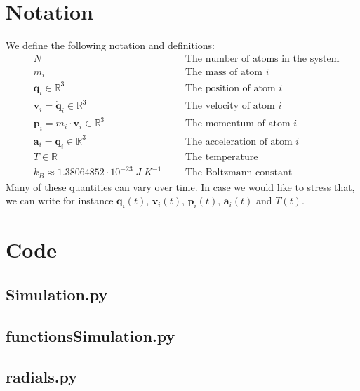 \documentclass[11pt,a4paper]{article}
\begin{document}
\section{Notation}\label{notation}
We define the following notation and definitions:
\begin{align*}
& N & & & \textrm{The number of atoms in the system} \\
& m_i & & & \textrm{The mass of atom } i \\
& \textbf{q}_i \in \mathbb{R}^3 & & & \textrm{The position of atom } i \\
& \textbf{v}_i = \textrm{$\dot{\textbf{q}}$}_i \in \mathbb{R}^3 & & & \textrm{The velocity of atom } i \\
& \textbf{p}_i = m_i \cdot \textbf{v}_i \in \mathbb{R}^3 & & & \textrm{The momentum of atom } i \\
& \textbf{a}_i = \textrm{$\ddot{\textbf{q}}$}_i \in \mathbb{R}^3 & & & \textrm{The acceleration of atom } i \\
& T \in \mathbb{R} & & & \textrm{The temperature} \\
& k_B \approx 1.38064852\cdot 10^{-23} \; J \; K^{-1} & & & \textrm{The Boltzmann constant}
\end{align*}
Many of these quantities can vary over time. In case we would like to stress that, we can write for instance $\textbf{q}_i(t)$, $\textbf{v}_i(t)$, $\textbf{p}_i(t)$, $\textbf{a}_i(t)$ and $T(t)$. 

\section{Code}
\label{code}

\subsection{Simulation.py}
	
\clearpage

\subsection{functionsSimulation.py}
	
\clearpage

\subsection{radials.py}
	
\end{document}
